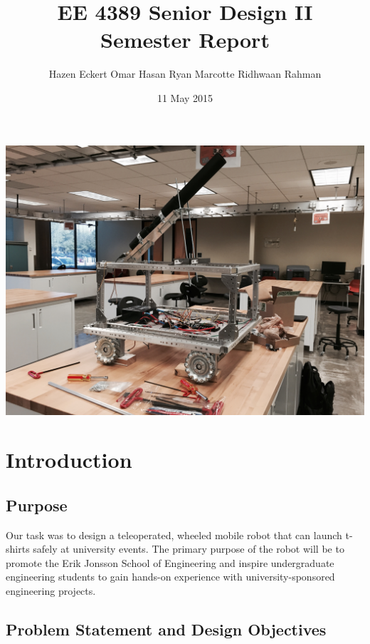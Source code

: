 \documentclass[letterpaper,12pt]{article}
\begin{document}
\title{\textbf{EE 4389 Senior Design II\\Semester Report}}
\author{Hazen Eckert \hspace{3mm} Omar Hasan \hspace{3mm} Ryan Marcotte \hspace{3mm} Ridhwaan Rahman}
\date{11 May 2015}
\maketitle

\begin{center}
    \includegraphics[width=15cm]{./pics/chassis/robot.jpg}
\end{center}

\pagebreak
\tableofcontents
\pagebreak

\section{Introduction}
\label{sec:intro}

\subsection{Purpose}
\label{sec:purpose}
Our task was to design a teleoperated, wheeled mobile robot that can launch
t-shirts safely at university events. The primary purpose of the robot will be
to promote the Erik Jonsson School of Engineering and inspire undergraduate
engineering students to gain hands-on experience with university-sponsored
engineering projects.

\subsection{Problem Statement and Design Objectives}
\label{sec:probstatement}
\end{document}

